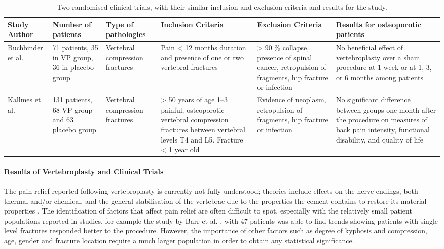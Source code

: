 \begin{table}[hbt]
    \caption{Two randomised clinical trials, with their similar inclusion and
exclusion criteria and results for the study.}
    \label{tab:randclinical}
\begin{tabular}{P{2cm}|P{2cm}|P{2cm}|P{2.5cm}|P{2.5cm}|P{2.3cm}}
Study Author & Number of patients & Type of pathologies & Inclusion Criteria & Exclusion Criteria & Results for osteoporotic patients\\ 
\hline
\hline
Buchbinder et al. \cite{Buchbinder2009} & 71 patients, 35 in VP group, 36 in
placebo group & Vertebral
compression fractures & Pain \textless{} 12 months
duration and presence of one or two vertebral fractures & \textgreater{}
90 \% collapse, presence of spinal cancer, retropulsion of fragments,
hip fracture or infection & No beneficial effect of vertebroplasty over
a sham procedure at 1 week or at 1, 3, or 6 months among
patients\\
\hline
Kallmes et al. \cite{Kallmes2009} & 131 patients, 68 VP group and 63 placebo
group
& Vertebral compression fractures & \textgreater{} 50 years of age 1--3
painful, osteoporotic vertebral compression fractures between vertebral
levels T4 and L5. Fracture \textless{} 1 year old & Evidence of
neoplasm, retropulsion of fragments, hip fracture or infection & No
significant difference between groups one month after the procedure on
measures of back pain intensity, functional disability, and quality of
life\tabularnewline

\end{tabular}
\end{table}

\paragraph{Results of Vertebroplasty and Clinical
Trials}\label{results-of-vertebroplasty-and-clinical-trials}

The pain relief reported following vertebroplasty is currently not fully
understood; theories include effects on the nerve endings, both thermal
and/or chemical, and the general stabilisation of the vertebrae due to
the properties the cement contains to restore its material properties
\cite{belkoff2001biomechanics}. The identification of factors that affect
pain relief are
often difficult to spot, especially with the relatively small patient
populations reported in studies, for example the study by Barr et al.
\cite{belkoff2002ex}, with 47 patients was able to find trends showing
patients with
single level fractures responded better to the procedure. However, the
importance of other factors such as degree of kyphosis and compression,
age, gender and fracture location require a much larger population in
order to obtain any statistical significance.

